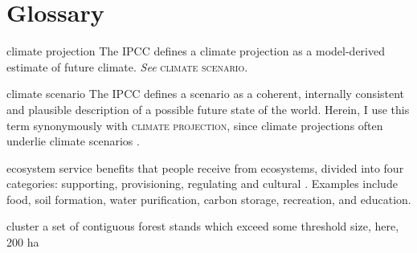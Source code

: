 
\chapter*{Glossary}      %
\thispagestyle{plain}
%
\begin{glossary}

\item[climate projection] The IPCC defines a climate projection as a model-derived estimate of future climate. \textit{See} \textsc{climate scenario}\cite{ipcc2013Definition}.

\item[climate scenario] The IPCC defines a scenario as a coherent, internally consistent and plausible description of a possible future state of the world. Herein, I use this term synonymously with \textsc{climate projection}, since climate projections often underlie climate scenarios \cite{ipcc2013Definition}.

\item[ecosystem service] benefits that people receive from ecosystems, divided into four categories: supporting, provisioning, regulating and cultural \cite{assessment2005ecosystems}. Examples include food, soil formation, water purification, carbon storage, recreation, and education.

\item[cluster] a set of contiguous forest stands which exceed some threshold size, here, 200 ha
 
\end{glossary}
